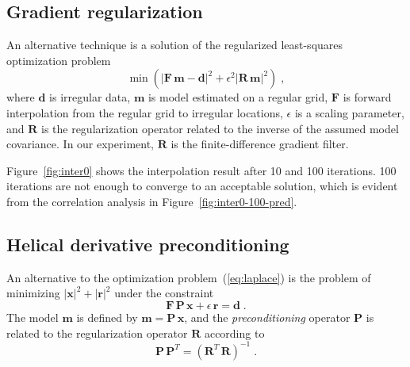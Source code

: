 \subsection{Gradient regularization}

An alternative technique is a solution of the regularized
least-squares optimization problem
\begin{equation}
\label{eq:laplace}
\min\left( |\mathbf{F}\,\mathbf{m} - \mathbf{d}|^2 + \epsilon^2 |\mathbf{R}\,\mathbf{m}|^2\right)\;,
\end{equation}
where $\mathbf{d}$ is irregular data, $\mathbf{m}$ is model estimated
on a regular grid, $\mathbf{F}$ is forward interpolation from the
regular grid to irregular locations, $\epsilon$ is a scaling
parameter, and $\mathbf{R}$ is the regularization operator related to
the inverse of the assumed model covariance. In our experiment,
$\mathbf{R}$ is the finite-difference gradient filter.


Figure~\ref{fig:inter0} shows the interpolation result after 10 and
100 iterations. 100 iterations are not enough to converge to an
acceptable solution, which is evident from the correlation analysis in
Figure~\ref{fig:inter0-100-pred}.


\subsection{Helical derivative preconditioning}

An alternative to the optimization problem~(\ref{eq:laplace}) is the
problem of minimizing $|\mathbf{x}|^2+|\mathbf{r}|^2$ under the
constraint 
\begin{equation}
\label{eq:precon}
\mathbf{F}\,\mathbf{P}\,\mathbf{x} + \epsilon\,\mathbf{r} = \mathbf{d}\;.
\end{equation}
The model $\mathbf{m}$ is defined by
$\mathbf{m}=\mathbf{P}\,\mathbf{x}$, and the \emph{preconditioning}
operator $\mathbf{P}$ is related to the regularization operator
$\mathbf{R}$ according to
\begin{equation}
\label{eq:covar}
\mathbf{P}\,\mathbf{P}^T = \left(\mathbf{R}^T\,\mathbf{R}\right)^{-1}\;.        
\end{equation}

